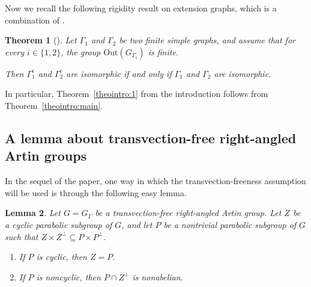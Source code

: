 \documentclass[JEP,XML,SOM,Unicode,NoFloatCountersInSection,published]{cedram}
\theoremstyle{plain}
\newtheorem{theo}{Theorem}[section]
\newtheorem{lemma}[theo]{Lemma}
\theoremstyle{definition}
\newcommand{\Out}{\mathrm{Out}}
\begin{document}
Now we recall the following rigidity result on extension graphs, which is a combination of \cite[Cor.\,4.16 and Lemma 4.17]{Hua}.

\begin{theo}[\cite{Hua}]\label{theo:rigidity}
Let $\Gamma_1$ and $\Gamma_2$ be two finite simple graphs, and assume that for every $i\in\{1,2\}$, the group $\Out(G_{\Gamma_i})$ is finite.

Then $\Gamma_1^e$ and $\Gamma_2^e$ are isomorphic if and only if $\Gamma_1$ and $\Gamma_2$ are isomorphic.
\end{theo}

In particular, Theorem~\ref{theointro:1} from the introduction follows from Theorem~\ref{theointro:main}.

\subsection{A lemma about transvection-free right-angled Artin groups}\label{sec:transvection-free}

In the sequel of the paper, one way in which the transvection-freeness assumption will be used is through the following easy lemma.

\begin{lemma}\label{lemma:transvection-free}
Let $G=G_\Gamma$ be a transvection-free right-angled Artin group. Let $Z$ be a cyclic parabolic subgroup of $G$, and let $P$ be a nontrivial parabolic subgroup of $G$ such that $Z\times Z^{\perp}\subseteq P\times P^{\perp}$.
\begin{enumerate}
\item If $P$ is cyclic, then $Z=P$.
\item If $P$ is noncyclic, then $P\cap Z^{\perp}$ is nonabelian.
\end{enumerate}
\end{lemma}
\end{document}
